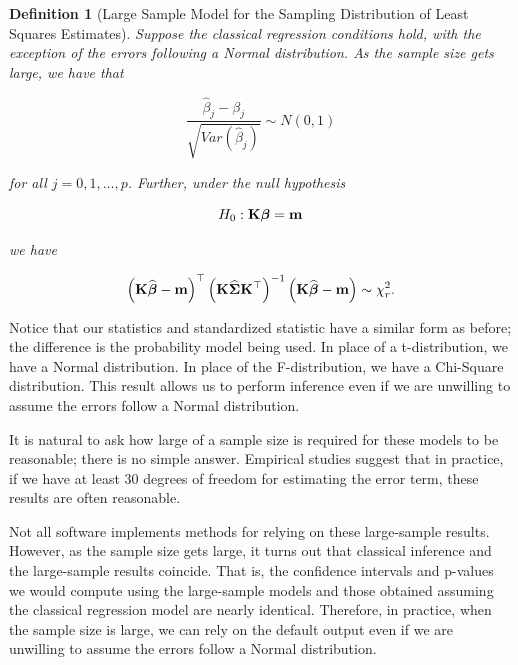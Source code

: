 \documentclass[
]{book}
\theoremstyle{plain}
\theoremstyle{mydefn}
\newtheorem{definition}{Definition}[chapter]
\theoremstyle{myexmpl}
\theoremstyle{remark}
\begin{document}
\begin{definition}[Large Sample Model for the Sampling Distribution of Least Squares Estimates]
\protect\hypertarget{def:defn-ls-sampling-distribution-large-samples}{}{\label{def:defn-ls-sampling-distribution-large-samples} {} }Suppose the classical regression conditions hold, with the exception of the errors following a Normal distribution. As the sample size gets large, we have that

\[\frac{\widehat{\beta}_j - \beta_j}{\sqrt{Var\left(\widehat{\beta}_j\right)}} \sim N(0, 1)\]

for all \(j = 0, 1, \dotsc, p\). Further, under the null hypothesis

\[H_0: \mathbf{K}\boldsymbol{\beta} = \mathbf{m}\]

we have

\[\left(\mathbf{K}\widehat{\boldsymbol{\beta}} - \mathbf{m}\right)^\top \left(\mathbf{K}\widehat{\boldsymbol{\Sigma}}\mathbf{K}^\top\right)^{-1} \left(\mathbf{K}\widehat{\boldsymbol{\beta}} - \mathbf{m}\right) \sim \chi^2_r.\]
\end{definition}

Notice that our statistics and standardized statistic have a similar form as before; the difference is the probability model being used. In place of a t-distribution, we have a Normal distribution. In place of the F-distribution, we have a Chi-Square distribution. This result allows us to perform inference even if we are unwilling to assume the errors follow a Normal distribution.

It is natural to ask how large of a sample size is required for these models to be reasonable; there is no simple answer. Empirical studies suggest that in practice, if we have at least 30 degrees of freedom for estimating the error term, these results are often reasonable.

\begin{rmdtip}
Not all software implements methods for relying on these large-sample results. However, as the sample size gets large, it turns out that classical inference and the large-sample results coincide. That is, the confidence intervals and p-values we would compute using the large-sample models and those obtained assuming the classical regression model are nearly identical. Therefore, in practice, when the sample size is large, we can rely on the default output even if we are unwilling to assume the errors follow a Normal distribution.
\end{rmdtip}
\end{document}
